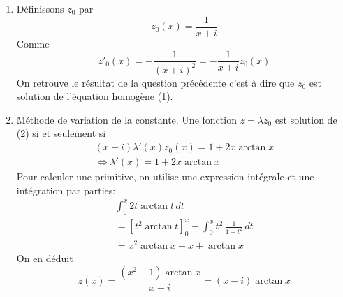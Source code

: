 \begin{enumerate}
  \item Définissons $z_0$ par 
\begin{displaymath}
  z_0(x) = \frac{1}{x + i}
\end{displaymath}
Comme
\begin{displaymath}
  z'_0(x) = -\frac{1}{(x + i)^2} = -\frac{1}{x+i}z_0(x)
\end{displaymath}
On retrouve le résultat de la question précédente c'est à dire que $z_0$ est solution de l'équation homogène (1).
  \item Méthode de variation de la constante. Une fonction $z=\lambda z_0$ est solution de (2) si et seulement si
\begin{multline*}
(x+i)\lambda'(x)z_0(x) = 1 + 2x\arctan x \\
\Leftrightarrow
\lambda'(x) = 1 + 2x\arctan x
\end{multline*}
Pour calculer une primitive, on utilise une expression intégrale et une intégration par parties:
\begin{multline*}
\int_0^x 2t\arctan t\, dt \\
= \left[ t^2 \arctan t\right]_{0}^{x} - \int_0^x t^2\,\frac{1}{1+t^2}\, dt  \\
= x^2 \arctan x - x + \arctan x
\end{multline*}
On en déduit 
\begin{displaymath}
z(x) = \frac{(x^2+1)\arctan x}{x+i} = (x-i)\arctan x   
\end{displaymath}

\end{enumerate}
